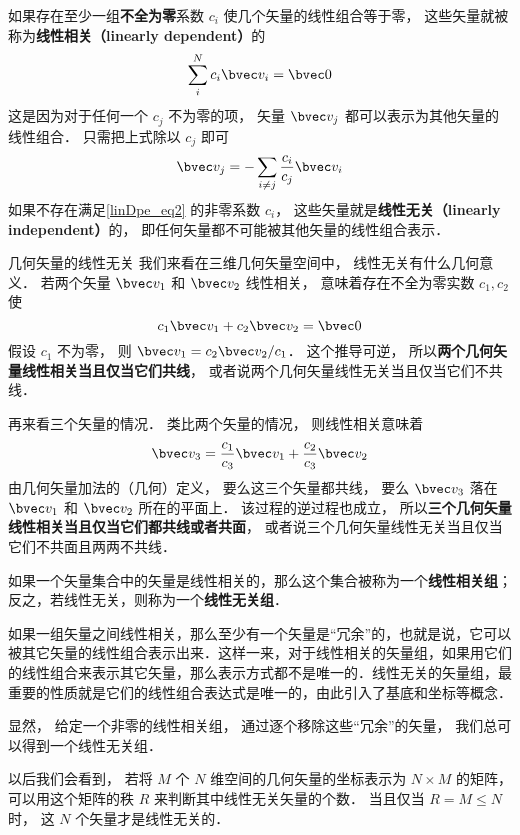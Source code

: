 

如果存在至少一组\textbf{不全为零}系数 $c_i$ 使几个矢量的线性组合等于零， 这些矢量就被称为\textbf{线性相关（linearly dependent）}的
\begin{equation}\label{linDpe_eq2}
\sum_i^N c_i \bvec v_i = \bvec 0
\end{equation}
这是因为对于任何一个 $c_j$ 不为零的项， 矢量 $\bvec v_j$ 都可以表示为其他矢量的线性组合． 只需把上式除以 $c_j$ 即可
\begin{equation}\label{linDpe_eq3}
\bvec v_j = -\sum_{i \ne j}\frac{c_i}{c_j} \bvec v_i
\end{equation}
如果不存在满足\autoref{linDpe_eq2} 的非零系数 $c_i$， 这些矢量就是\textbf{线性无关（linearly independent）}的， 即任何矢量都不可能被其他矢量的线性组合表示．

\begin{example}{几何矢量的线性无关}\label{linDpe_ex1}
我们来看在三维几何矢量空间中， 线性无关有什么几何意义． 若两个矢量 $\bvec v_1$ 和 $\bvec v_2$ 线性相关， 意味着存在不全为零实数 $c_1, c_2$ 使
\begin{equation}
c_1 \bvec v_1 + c_2 \bvec v_2 = \bvec 0
\end{equation}
假设 $c_1$ 不为零， 则 $\bvec v_1 = c_2 \bvec v_2 / c_1$． 这个推导可逆， 所以\textbf{两个几何矢量线性相关当且仅当它们共线}， 或者说两个几何矢量线性无关当且仅当它们不共线．

再来看三个矢量的情况． 类比两个矢量的情况， 则线性相关意味着
\begin{equation}
\bvec v_3 = \frac{c_1}{c_3} \bvec v_1 +  \frac{c_2}{c_3} \bvec v_2
\end{equation}
由几何矢量加法的（几何）定义， 要么这三个矢量都共线， 要么 $\bvec v_3$ 落在 $\bvec v_1$ 和 $\bvec v_2$ 所在的平面上． 该过程的逆过程也成立， 所以\textbf{三个几何矢量线性相关当且仅当它们都共线或者共面}， 或者说三个几何矢量线性无关当且仅当它们不共面且两两不共线．
\end{example}

如果一个矢量集合中的矢量是线性相关的，那么这个集合被称为一个\textbf{线性相关组}；反之，若线性无关，则称为一个\textbf{线性无关组}．

如果一组矢量之间线性相关，那么至少有一个矢量是“冗余”的，也就是说，它可以被其它矢量的线性组合表示出来．这样一来，对于线性相关的矢量组，如果用它们的线性组合来表示其它矢量，那么表示方式都不是唯一的．线性无关的矢量组，最重要的性质就是它们的线性组合表达式是唯一的，由此引入了基底和坐标等概念．

显然， 给定一个非零的线性相关组， 通过逐个移除这些“冗余”的矢量， 我们总可以得到一个线性无关组．

以后我们会看到， 若将 $M$ 个 $N$ 维空间的几何矢量的坐标表示为 $N\times M$ 的矩阵， 可以用这个矩阵的秩 $R$ 来判断其中线性无关矢量的个数． 当且仅当 $R = M \leqslant N$ 时， 这 $N$ 个矢量才是线性无关的．

